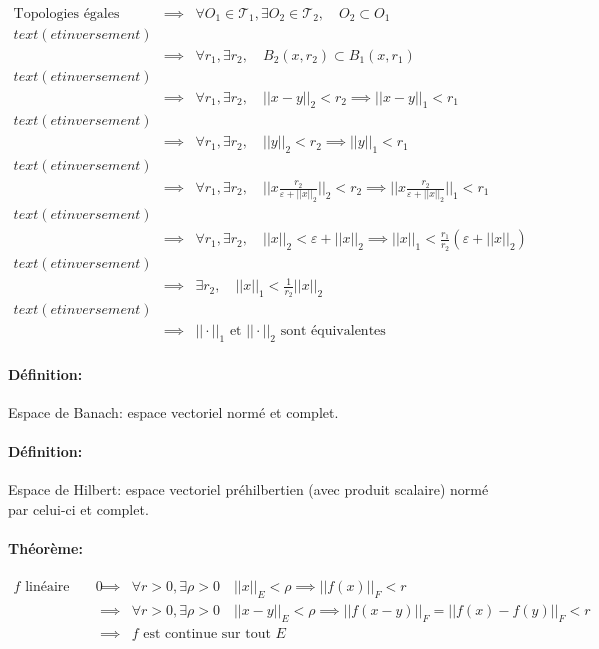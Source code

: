 \documentclass[a4paper, 11pt, french]{book}
\theoremstyle{plain} %
\theoremstyle{definition} %
\theoremstyle{remark} %
\newcommand{\1}{\mathds{1}}
\begin{document}
\fbox{$\Longleftarrow$} 
$
\begin{array}{rcl}
	\text{Topologies égales}
	&\implies &\forall O_1\in\mathscr{T}_1, \exists O_2\in\mathscr{T}_2, \quad O_2\subset O_1\\text{(et inversement)}\\
	&\implies &\forall r_1, \exists r_2, \quad B_2(x, r_2)\subset B_1(x, r_1)\\text{(et inversement)}\\
	&\implies &\forall r_1, \exists r_2, \quad ||x-y||_2<r_2\implies ||x-y||_1<r_1\\text{(et inversement)}\\
	&\implies &\forall r_1, \exists r_2, \quad ||y||_2<r_2\implies ||y||_1<r_1\\text{(et inversement)}\\
	&\implies &\forall r_1, \exists r_2, \quad ||x\frac{r_2}{\varepsilon+||x||_2}||_2<r_2\implies ||x\frac{r_2}{\varepsilon+||x||_2}||_1<r_1\\text{(et inversement)}\\
	&\implies &\forall r_1, \exists r_2, \quad ||x||_2<\varepsilon+||x||_2\implies ||x||_1<\frac{r_1}{r_2}(\varepsilon+||x||_2)\\text{(et inversement)}\\
	&\implies &\exists r_2, \quad ||x||_1 <\frac{1}{r_2}||x||_2\\text{(et inversement)}\\
	&\implies &\text{$|| \cdot||_1$ et $|| \cdot||_2$ sont équivalentes}
\end{array}
$

\paragraph{Définition:} Espace de Banach: espace vectoriel normé et complet.
\paragraph{Définition:} Espace de Hilbert: espace vectoriel préhilbertien (avec produit scalaire) normé par celui-ci et complet.

\paragraph{Théorème:}
$
\begin{array}{rcl}
	\text{$f$ linéaire entre evn continue en $0$}
	&\implies &\forall r > 0, \exists\rho > 0\quad ||x||_E <\rho\implies ||f(x)||_F < r\\
	&\implies &\forall r > 0, \exists\rho > 0\quad ||x-y||_E <\rho\implies ||f(x-y)||_F=||f(x)-f(y)||_F < r\\
	&\implies &\text{$f$ est continue sur tout $E$}
\end{array}
$
\end{document}
